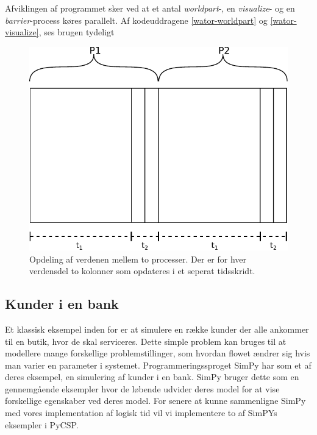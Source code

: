 Afviklingen af programmet sker ved at et antal \emph{worldpart}-, en 
\emph{visualize}- og en \emph{barrier}-process køres parallelt. Af 
kodeuddragene \autoref{wator-worldpart} og \ref{wator-visualize}, ses brugen 
tydeligt 


\begin{figure}[hbtp] \begin{center}
  \includegraphics[scale=0.75]{images/wator}
  \caption{Opdeling af verdenen mellem to processer. Der er for hver verdensdel 
  to kolonner som opdateres i et seperat tidsskridt.}
  \label{fig:wator}
  \end{center}
\end{figure}

\subsection{Kunder i en bank} Et klassisk eksempel inden for \des er at simulere  
en række kunder der alle ankommer til en butik, hvor de skal serviceres. Dette 
simple problem kan bruges til at modellere mange forskellige 
problemstillinger, som hvordan flowet ændrer sig hvis man varier en parameter 
i systemet. Programmeringssproget SimPy har som et af deres eksempel, en 
simulering af kunder i en bank. SimPy bruger dette som en gennemgående 
eksempler hvor de løbende udvider deres model for at vise forskellige 
egenskaber ved deres model. For senere at kunne sammenligne SimPy  med vores 
implementation af logisk tid vil vi implementere to af SimPYs eksempler i PyCSP.

